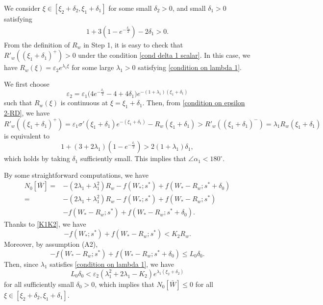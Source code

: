 \documentclass[11pt,a4paper]{article}
\numberwithin{equation}{section}
\numberwithin{figure}{section}
\newcommand\bea{\begin{eqnarray}}
\newcommand\eea{\end{eqnarray}}
\begin{document}
\medskip


 We consider $\xi\in[\xi_2+\delta_2,\xi_1+\delta_1]$ for some small $\delta_2>0$, and small $\delta_1>0$ satisfying
\bea\label{cond delta 1 scalar}
1+3(1-e^{-\frac{\delta_1}{2}})-2\delta_1>0.
\eea
From the definition of $R_w$ in Step 1, it is easy to check that $R'_w((\xi_1+\delta_1)^+)>0$ under the condition \eqref{cond delta 1 scalar}.
In this case, we have $R_w(\xi)=\varepsilon_2 e^{\lambda_1\xi}$
for some large $\lambda_1>0$ satisfying \eqref{condition on lambda 1}.

We first choose
\begin{equation}\label{condition on epsilon 2-RD}
\varepsilon_2=\varepsilon_1\Big(4e^{-\frac{\delta_1}{2}}-4+4\delta_1\Big)e^{-(1+\lambda_1)(\xi_1+\delta_1)}
\end{equation}
such that $R_w(\xi)$ is continuous at $\xi=\xi_{1}+\delta_1$. Then, from \eqref{condition on epsilon 2-RD}, we have
$$R'_w((\xi_1+\delta_1)^{+})=\varepsilon_1\sigma'(\xi_1+\delta_1)e^{-(\xi_1+\delta_1)}- R_w(\xi_1+\delta_1)>R'_w((\xi_1+\delta_1)^{-})=\lambda_1R_w(\xi_1+\delta_1)$$
is equivalent to
$$1+(3+2\lambda_1)(1-e^{-\frac{\delta_1}{2}})>2(1+\lambda_1)\delta_1,$$
which holds by taking $\delta_1$ sufficiently small.
This implies that $\angle\alpha_1<180^{\circ}$.

By some  straightforward computations, we have
\begin{equation*}
\begin{aligned}
N_0[\bar W]=&-(2\lambda_1+\lambda_1^2)R_w-f(W_*;s^*)+f(W_*-R_w;s^*+\delta_0)\\
=&-(2\lambda_1+\lambda_1^2)R_w-f(W_*;s^*)+f(W_*-R_w;s^*)\\
&-f(W_*-R_w;s^*)+f(W_*-R_w;s^*+\delta_0).
\end{aligned}
\end{equation*}
Thanks to \eqref{K1K2}, we have
$$-f(W_*;s^*)+f(W_*-R_w;s^*)< K_2R_w.$$
Moreover, by assumption (A2), %
$$-f(W_*-R_w;s^*)+f(W_*-R_w;s^*+\delta_0)\le L_0\delta_0.$$
Then, %
since
$\lambda_1$ satisfies \eqref{condition on lambda 1}, we have
$$L_0\delta_0<\varepsilon_2(\lambda_1^2+2\lambda_1-K_2) e^{\lambda_1(\xi_2+\delta_2)}$$
for all sufficiently small $\delta_0>0$,
which implies that $N_0[\bar W]\le 0$ for all $\xi\in[\xi_2+\delta_2,\xi_1+\delta_1]$.


\medskip
\end{document}
